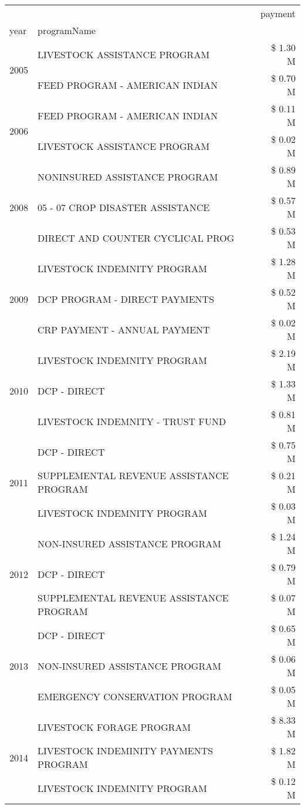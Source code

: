 \begin{tabular}{llr}
\toprule
 &  & payment \\
year & programName &  \\
\midrule
\multirow[t]{2}{*}{2005} & LIVESTOCK ASSISTANCE PROGRAM & \$ 1.30 M \\
 & FEED PROGRAM - AMERICAN INDIAN & \$ 0.70 M \\
\cline{1-3}
\multirow[t]{2}{*}{2006} & FEED PROGRAM - AMERICAN INDIAN & \$ 0.11 M \\
 & LIVESTOCK ASSISTANCE PROGRAM & \$ 0.02 M \\
\cline{1-3}
\multirow[t]{3}{*}{2008} & NONINSURED ASSISTANCE PROGRAM & \$ 0.89 M \\
 & 05 - 07 CROP DISASTER ASSISTANCE & \$ 0.57 M \\
 & DIRECT AND COUNTER CYCLICAL PROG & \$ 0.53 M \\
\cline{1-3}
\multirow[t]{3}{*}{2009} & LIVESTOCK INDEMNITY PROGRAM & \$ 1.28 M \\
 & DCP PROGRAM - DIRECT PAYMENTS & \$ 0.52 M \\
 & CRP PAYMENT - ANNUAL PAYMENT & \$ 0.02 M \\
\cline{1-3}
\multirow[t]{3}{*}{2010} & LIVESTOCK INDEMNITY PROGRAM & \$ 2.19 M \\
 & DCP - DIRECT & \$ 1.33 M \\
 & LIVESTOCK INDEMNITY - TRUST FUND & \$ 0.81 M \\
\cline{1-3}
\multirow[t]{3}{*}{2011} & DCP - DIRECT & \$ 0.75 M \\
 & SUPPLEMENTAL REVENUE ASSISTANCE PROGRAM & \$ 0.21 M \\
 & LIVESTOCK INDEMNITY PROGRAM & \$ 0.03 M \\
\cline{1-3}
\multirow[t]{3}{*}{2012} & NON-INSURED ASSISTANCE PROGRAM & \$ 1.24 M \\
 & DCP - DIRECT & \$ 0.79 M \\
 & SUPPLEMENTAL REVENUE ASSISTANCE PROGRAM & \$ 0.07 M \\
\cline{1-3}
\multirow[t]{3}{*}{2013} & DCP - DIRECT & \$ 0.65 M \\
 & NON-INSURED ASSISTANCE PROGRAM & \$ 0.06 M \\
 & EMERGENCY CONSERVATION PROGRAM & \$ 0.05 M \\
\cline{1-3}
\multirow[t]{3}{*}{2014} & LIVESTOCK FORAGE PROGRAM & \$ 8.33 M \\
 & LIVESTOCK INDEMINITY PAYMENTS PROGRAM & \$ 1.82 M \\
 & LIVESTOCK INDEMNITY PROGRAM & \$ 0.12 M \\

\end{tabular}
